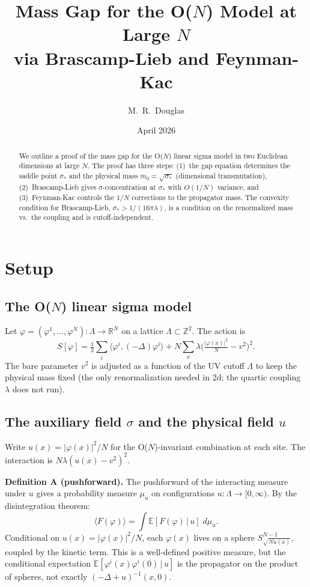 \documentclass[12pt]{article}
\title{Mass Gap for the O($N$) Model at Large $N$\\
via Brascamp-Lieb and Feynman-Kac}
\author{M.~R.~Douglas}
\date{April 2026}
\theoremstyle{definition}
\theoremstyle{remark}
\newcommand{\R}{\mathbb{R}}
\newcommand{\Z}{\mathbb{Z}}
\newcommand{\E}{\mathbb{E}}
\newcommand{\ph}{\varphi}
\begin{document}
\maketitle

\begin{abstract}
We outline a proof of the mass gap for the O($N$) linear sigma model
in two Euclidean dimensions at large $N$. The proof has three steps:
(1)~the gap equation determines the saddle point $\sigma_*$ and the
physical mass $m_0 = \sqrt{\sigma_*}$ (dimensional transmutation),
(2)~Brascamp-Lieb gives $\sigma$-concentration at $\sigma_*$ with
$O(1/N)$ variance, and (3)~Feynman-Kac controls the $1/N$ corrections
to the propagator mass. The convexity condition for Brascamp-Lieb,
$\sigma_* > 1/(16\pi\lambda)$, is a condition on the renormalized
mass vs.\ the coupling and is cutoff-independent.
\end{abstract}

\tableofcontents

\section{Setup}

\subsection{The O($N$) linear sigma model}

Let $\ph = (\ph^1,\ldots,\ph^N) : \Lambda \to \R^N$ on a lattice
$\Lambda \subset \Z^2$. The action is
\begin{equation}
  S[\ph] = \tfrac{1}{2}\sum_i\langle\ph^i,(-\Delta)\ph^i\rangle
    + N\sum_x\lambda\bigl(\tfrac{|\ph(x)|^2}{N}-v^2\bigr)^2.
\end{equation}
The bare parameter $v^2$ is adjusted as a function of the UV cutoff
$\Lambda$ to keep the physical mass fixed (the only renormalization
needed in 2d; the quartic coupling $\lambda$ does not run).

\subsection{The auxiliary field $\sigma$ and the physical field $u$}

Write $u(x) = |\ph(x)|^2/N$ for the O($N$)-invariant combination
at each site. The interaction is $N\lambda(u(x)-v^2)^2$.

\medskip\noindent
\textbf{Definition A (pushforward).}
The pushforward of the interacting measure under $u$ gives a
probability measure $\mu_u$ on configurations $u:\Lambda\to[0,\infty)$.
By the disintegration theorem:
\begin{equation}
\label{eq:disint}
  \langle F(\ph)\rangle = \int\! \E[F(\ph)\,|\,u]\;d\mu_u.
\end{equation}
Conditional on $u(x) = |\ph(x)|^2/N$, each $\ph(x)$ lives on a
sphere $S^{N-1}_{\sqrt{Nu(x)}}$, coupled by the kinetic term.
This is a well-defined positive measure, but the conditional
expectation $\E[\ph^i(x)\ph^i(0)\,|\,u]$ is the propagator on
the product of spheres, not exactly $(-\Delta+u)^{-1}(x,0)$.
\end{document}
